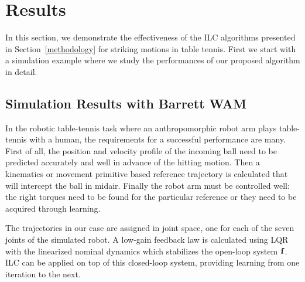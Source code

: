 \section{Results}\label{results}

In this section, we demonstrate the effectiveness of the ILC algorithms presented in Section~\ref{methodology} for striking motions in table tennis. First we start with a simulation example where we study the performances of our proposed algorithm in detail.
%
\subsection{Simulation Results with Barrett WAM}

In the robotic table-tennis task where an anthropomorphic robot arm plays table-tennis with a human, the requirements for a successful performance are many. First of all, the position and velocity profile of the incoming ball need to be predicted accurately and well in advance of the hitting motion. Then a kinematics or movement primitive based reference trajectory is calculated that will intercept the ball in midair. Finally the robot arm must be controlled well: the right torques need to be found for the particular reference or they need to be acquired through learning.

The trajectories in our case are assigned in joint space, one for each of the seven joints of the simulated robot. A low-gain feedback law is calculated using LQR with the linearized nominal dynamics which stabilizes the open-loop system $\boldsymbol{\mathrm{f}}$. ILC can be applied on top of this closed-loop system, providing learning from one iteration to the next. 

